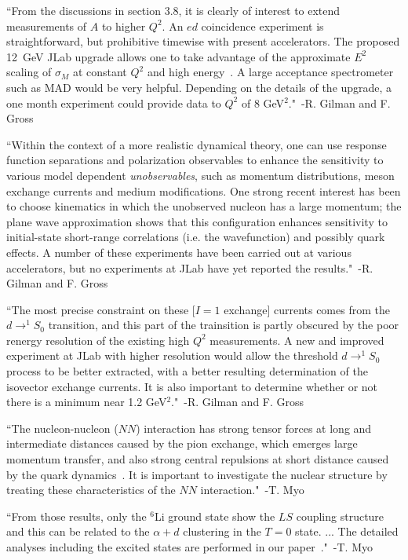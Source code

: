 ``From the discussions in section 3.8, it is clearly of interest to extend measurements of $A$ to higher $Q^2$. An $ed$ coincidence experiment is straightforward, but prohibitive timewise with present accelerators. The proposed 12~GeV JLab upgrade allows one to take advantage of the approximate $E^2$ scaling of $\sigma_M$ at constant $Q^2$ and high energy~\cite{Petratos:2002wz}. A large acceptance spectrometer such as MAD would be very helpful. Depending on the details of the upgrade, a one month experiment could provide data to $Q^2$ of 8 GeV$^2$."~-R. Gilman and F. Gross~\cite{Gilman:2001yh}

``Within the context of a more realistic dynamical theory, one can use response function separations and polarization observables to enhance the sensitivity to various model dependent \emph{unobservables}, such as momentum distributions, meson exchange currents and medium modifications. One strong recent interest has been to choose kinematics in which the unobserved nucleon has a large momentum; the plane wave approximation shows that this configuration enhances sensitivity to initial-state short-range correlations (i.e. the wavefunction) and possibly quark effects. A number of these experiments have been carried out at various accelerators, but no experiments at JLab have yet reported the results."~-R. Gilman and F. Gross~\cite{Gilman:2001yh}

``The most precise constraint on these [$I=1$ exchange] currents comes from the $d\rightarrow ^1S_0$ transition, and this part of the trainsition is partly obscured by the poor renergy resolution of the existing high $Q^2$ measurements. A new and improved experiment at JLab with higher resolution would allow the threshold $d\rightarrow ^1S_0$ process to be better extracted, with a better resulting determination of the isovector exchange currents. It is also important to determine whether or not there is a minimum near 1.2 GeV$^2$."~-R. Gilman and F. Gross~\cite{Gilman:2001yh}

``The nucleon-nucleon ($NN$) interaction has strong tensor forces at long and intermediate distances caused by the pion exchange, which emerges large momentum transfer, and also strong central repulsions at short distance caused by the quark dynamics~\cite{Pieper:2001mp,Kamada:2001tv}. It is important to investigate the nuclear structure by treating these characteristics of the $NN$ interaction."~-T. Myo~\cite{Myo:2013dya}

``From those results, only the $^6$Li ground state show the $LS$ coupling structure and this can be related to the $\alpha + d$ clustering in the $T=0$ state. ... The detailed analyses including the excited states are performed in our paper~\cite{Myo:2012pv}."~-T. Myo~\cite{Myo:2013dya}

